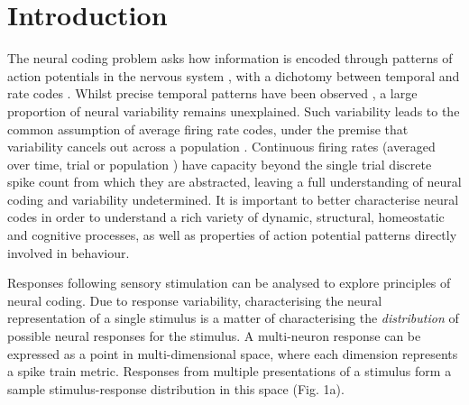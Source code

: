 \documentclass{article}
\begin{document}
\section{Introduction}
The neural coding problem asks how information is encoded through patterns of action potentials in the nervous system \cite{gerstner1997neural, johnson2000neural, stein2005neuronal, gerstner2014neuronal}, with a dichotomy between temporal \cite{uzzell2004precision, johansson2004first, gollisch2008rapid, storchi2012comparison, reinagel2002precise, reyes2014laminar} and rate codes \cite{hong2016explicit, chang2017code, kar2019evidence, stringer2019high}. 
Whilst precise temporal patterns have been observed \cite{uzzell2004precision, johansson2004first, gollisch2008rapid, storchi2012comparison, reinagel2002precise, reyes2014laminar}, a large proportion of neural variability remains unexplained. Such variability leads to the common assumption of average firing rate codes, under the premise that variability cancels out across a population \cite{abbott1999effect, moreno2014information, stringer2019high}. Continuous firing rates (averaged over time, trial or population \cite{gerstner1997neural}) have capacity beyond the single trial discrete spike count from which they are abstracted, leaving a full understanding of neural coding and variability undetermined. It is important to better characterise neural codes in order to understand a rich variety of dynamic, structural, homeostatic and cognitive processes, as well as properties of action potential patterns directly involved in behaviour.

Responses following sensory stimulation can be analysed to explore principles of neural coding. Due to response variability, characterising the neural representation of a single stimulus is a matter of characterising the \textit{distribution} of possible neural responses for the stimulus. A multi-neuron response can be expressed as a point in multi-dimensional space, where each dimension represents a spike train metric. Responses from multiple presentations of a stimulus form a sample stimulus-response distribution in this space (Fig. 1a). 
\end{document}
